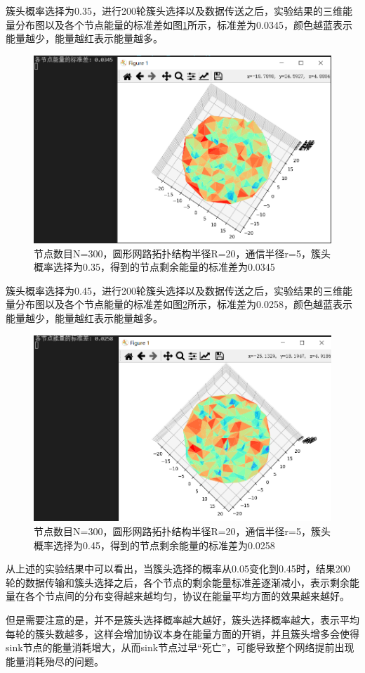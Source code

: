\documentclass[UTF8]{article} %
\begin{document}
	簇头概率选择为0.35，进行200轮簇头选择以及数据传送之后，实验结果的三维能量分布图以及各个节点能量的标准差如图\ref{fig:screenshot009}所示，标准差为0.0345，颜色越蓝表示能量越少，能量越红表示能量越多。
	\begin{figure}[H]
		\centering
		\includegraphics[width=0.7\linewidth]{screenshot009}
		\caption{节点数目N=300，圆形网路拓扑结构半径R=20，通信半径r=5，簇头概率选择为0.35，得到的节点剩余能量的标准差为0.0345}
		\label{fig:screenshot009}
	\end{figure}

	簇头概率选择为0.45，进行200轮簇头选择以及数据传送之后，实验结果的三维能量分布图以及各个节点能量的标准差如图\ref{fig:screenshot010}所示，标准差为0.0258，颜色越蓝表示能量越少，能量越红表示能量越多。
	\begin{figure}
		\centering
		\includegraphics[width=0.7\linewidth]{screenshot010}
		\caption{节点数目N=300，圆形网路拓扑结构半径R=20，通信半径r=5，簇头概率选择为0.45，得到的节点剩余能量的标准差为0.0258}
		\label{fig:screenshot010}
	\end{figure}

	从上述的实验结果中可以看出，当簇头选择的概率从0.05变化到0.45时，结果200轮的数据传输和簇头选择之后，各个节点的剩余能量标准差逐渐减小，表示剩余能量在各个节点间的分布变得越来越均匀，协议在能量平均方面的效果越来越好。
	
	但是需要注意的是，并不是簇头选择概率越大越好，簇头选择概率越大，表示平均每轮的簇头数越多，这样会增加协议本身在能量方面的开销，并且簇头增多会使得sink节点的能量消耗增大，从而sink节点过早“死亡”，可能导致整个网络提前出现能量消耗殆尽的问题。
	
\end{document}
